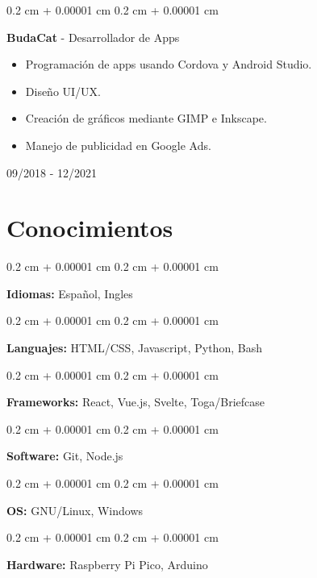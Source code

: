 \documentclass[12pt, letterpaper]{article}
\newenvironment{highlights}{
    \begin{itemize}[
        topsep=0.10 cm,
        parsep=0.10 cm,
        partopsep=0pt,
        itemsep=0pt,
        leftmargin=0.4 cm + 10pt
    ]
}{
    \end{itemize}
} %
\newenvironment{onecolentry}{
    \begin{adjustwidth}{
        0.2 cm + 0.00001 cm
    }{
        0.2 cm + 0.00001 cm
    }
}{
    \end{adjustwidth}
} %
\newenvironment{twocolentry}[2][]{
    \onecolentry
    \def\secondColumn{#2}
    \setcolumnwidth{\fill, 4.5 cm}
    \begin{paracol}{2}
}{
    \switchcolumn \raggedleft \secondColumn
    \end{paracol}
    \endonecolentry
} %
\begin{document}
\vspace{0.3 cm}

\begin{twocolentry}{

        09/2018 - 12/2021
    }
    \textbf{BudaCat} - Desarrollador de Apps
    \begin{highlights}
        \item Programación de apps usando Cordova y Android Studio.
        \item Diseño UI/UX.
        \item Creación de gráficos mediante GIMP e Inkscape.
        \item Manejo de publicidad en Google Ads.
    \end{highlights}
\end{twocolentry}

\vspace{0.5 cm}

\section{Conocimientos}

\vspace{0.2 cm}

\begin{onecolentry}
    \textbf{Idiomas:} Español, Ingles
\end{onecolentry}

\vspace{0.2 cm}

\begin{onecolentry}
    \textbf{Languajes:} HTML/CSS, Javascript, Python, Bash
\end{onecolentry}

\vspace{0.2 cm}

\begin{onecolentry}
    \textbf{Frameworks:} React, Vue.js, Svelte, Toga/Briefcase
\end{onecolentry}

\vspace{0.2 cm}

\begin{onecolentry}
    \textbf{Software:} Git, Node.js
\end{onecolentry}

\vspace{0.2 cm}

\begin{onecolentry}
    \textbf{OS:} GNU/Linux, Windows
\end{onecolentry}

\vspace{0.2 cm}

\begin{onecolentry}
    \textbf{Hardware:} Raspberry Pi Pico, Arduino
\end{onecolentry}
\end{document}
